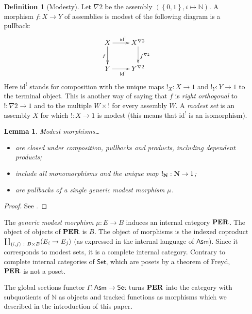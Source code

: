 \documentclass{amsart}
\theoremstyle{plain}
\newtheorem{lemma}[theorem]{Lemma}
\theoremstyle{definition}
\newtheorem{defin}[theorem]{Definition}
\newcommand\hide[1]{}
\newcommand\set[1]{\left\{#1\right\}}
\newcommand\id{\mathrm{id}}
\newcommand\Set{\mathsf{Set}}
\newcommand\N{\mathbb N}
\newcommand\Asm{\mathsf{Asm}}
\begin{document}
\newcommand\bang{!}
\begin{defin}[Modesty]
Let $\nabla 2$ be the assembly $(\set{0,1}, i \mapsto \N)$. A morphism $f:X\to Y$ of assemblies is modest of the following diagram is a pullback:
\[\xymatrix{
X \ar[r]^{\id^\bang} \ar[d]_{f} & X^{\nabla 2} \ar[d]^{f^{\nabla 2}}\\
Y \ar[r]_{\id^\bang} & Y^{\nabla 2}
}\]
Here $\id^\bang$ stands for composition with the unique maps $\bang_X:X\to 1$ and $\bang_Y: Y\to 1$ to the terminal object. This is another way of saying that $f$ is \emph{right orthogonal} to $\bang:\nabla 2\to 1$ and to the multiple $W\times \bang$ for every assembly $W$. A \emph{modest set} is an assembly $X$ for which $\bang:X\to 1$ is modest (this means that $\id^\bang$ is an isomorphism).
\end{defin}

\begin{lemma} Modest morphisms\dots
\begin{itemize}
\item are closed under composition, pullbacks and products, including dependent products; 
\item include all monomorphisms and the unique map $\bang_\nno:\nno \to 1$;%
\item are pullbacks of a single \emph{generic modest morphism} $\mu$.
\end{itemize}\end{lemma}

\begin{proof} See \cite{MR1023803,MR2479466,MR1097022}. \end{proof}

The \emph{generic modest morphism} $\mu:E\to B$ induces an internal category $\mathbf{PER}$. The object of objects of $\mathbf{PER}$ is $B$. The object of morphisms is the indexed coproduct $\coprod_{(i,j)\mathord{\ :\ } B\times B} (E_i\to E_j)$ (as expressed in the internal language of $\Asm$). Since it corresponds to modest sets, it is a complete internal category. Contrary to complete internal categories of $\Set$, which are posets by a theorem of Freyd, $\mathbf{PER}$ is not a poset. \hide{cite Freyd!?}

The global sections functor $\Gamma:\Asm \to\Set$ turns $\mathbf{PER}$ into the category with subquotients of $\N$ as objects and tracked functions as morphisms which we described in the introduction of this paper.
\end{document}
